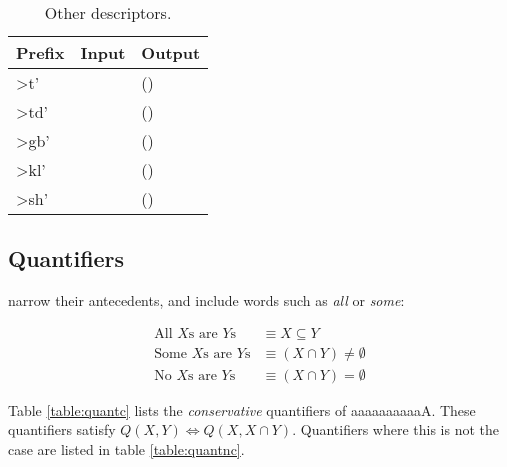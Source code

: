 \documentclass{book}
\newcommand{\lname}{aaaaaaaaaaA}
\begin{document}
\begin{table}[h]
  \caption{Other descriptors.}
  \centering
  \begin{tabu}to 
    \textnormal{Prefix} & Input & Output \\
    \hline
    >t' &  &
    () \\
    >td' &  &
    () \\
    >gb' &  &
    () \\
    >kl' &  &
    () \\
    >sh' &  &
    () \\
  \end{tabu}
\end{table}

\subsection{Quantifiers}

 narrow their antecedents, and include words such as \emph{all} or \emph{some}:

\begin{align}
  \text{All $X$s are $Y$s} &\equiv X \subseteq Y \\
  \text{Some $X$s are $Y$s} &\equiv (X \cap Y) \neq \emptyset \\
  \text{No $X$s are $Y$s} &\equiv (X \cap Y) = \emptyset
\end{align}

Table \ref{table:quantc} lists the \emph{conservative} quantifiers of \lname. These quantifiers satisfy $Q(X, Y) \iff Q(X, X \cap Y)$. Quantifiers where this is not the case are listed in table \ref{table:quantnc}.
\end{document}
